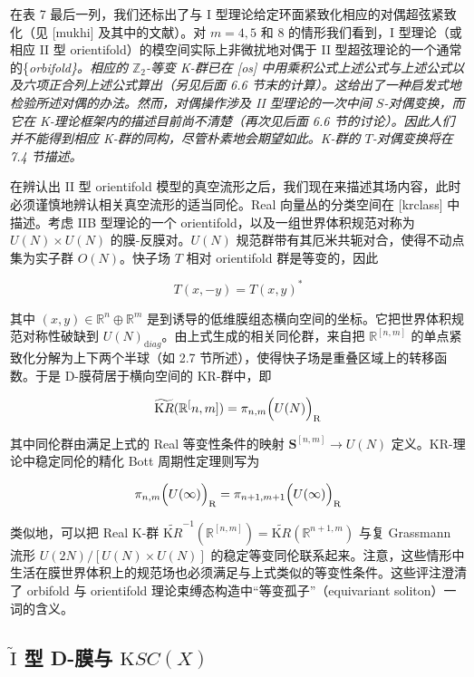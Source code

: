 \documentclass[11pt,a4paper]{ctexart}
\newcommand{\SrcRange}[2]{\marginpar{\raggedright\footnotesize 原文 p.#1}}
\begin{document}
在表 7 最后一列，我们还标出了与 I 型理论给定环面紧致化相应的对偶超弦紧致化（见 [mukhi] 及其中的文献）。对 \(m=4,5\) 和 8 的情形我们看到，I 型理论（或相应 II 型 orientifold）的模空间实际上非微扰地对偶于 II 型超弦理论的一个通常的\{\it orbifold\}。相应的 \({\mathbb{Z}}_2\)-等变 K-群已在 [os] 中用乘积公式上述公式与上述公式以及六项正合列上述公式算出（另见后面 6.6 节末的计算）。这给出了一种启发式地检验所述对偶的办法。然而，对偶操作涉及 II 型理论的一次中间 \(S\)-对偶变换，而它在 K-理论框架内的描述目前尚不清楚（再次见后面 6.6 节的讨论）。因此人们并不能得到相应 K-群的同构，尽管朴素地会期望如此。K-群的 \(T\)-对偶变换将在 7.4 节描述。

在辨认出 II 型 orientifold 模型的真空流形之后，我们现在来描述其场内容，此时必须谨慎地辨认相关真空流形的适当同伦。Real 向量丛的分类空间在 [krclass] 中描述。考虑 IIB 型理论的一个 orientifold，以及一组世界体积规范对称为 \(U(N)\times U(N)\) 的膜-反膜对。\(U(N)\) 规范群带有其厄米共轭对合，使得不动点集为实子群 \(O(N)\)。快子场 \(T\) 相对 orientifold 群是等变的，因此

\[T(x,-y)=T(x,y)^*\]

其中 \((x,y)\in{\mathbb{R}}^n\oplus{\mathbb{R}}^m\) 是到诱导的低维膜组态横向空间的坐标。它把世界体积规范对称性破缺到 \(U(N)_{\mathrm diag}\)。由上式生成的相关同伦群，来自把 \({\mathbb{R}}^[n,m]\) 的单点紧致化分解为上下两个半球（如 2.7 节所述），使得快子场是重叠区域上的转移函数。于是 D-膜荷居于横向空间的 KR-群中，即

\[\widetilde{{\mathrm KR}}({\mathbb{R}}^[n,m])=\pi_{n,m}\Bigl(U(N)\Bigr)_{\mathrm R}\]

其中同伦群由满足上式的 Real 等变性条件的映射 \({\mathbf S}^[n,m]\to U(N)\) 定义。KR-理论中稳定同伦的精化 Bott 周期性定理则写为

\[\pi_{n,m}\Bigl(U(\infty)\Bigr)_{\mathrm R}=
\pi_{n+1,m+1}\Bigl(U(\infty)\Bigr)_{\mathrm R}\]

类似地，可以把 Real K-群 \(\widetilde{{\mathrm KR}}^{-1}({\mathbb{R}}^[n,m])=\widetilde{{\mathrm KR}}({\mathbb{R}}^{n+1,m})\) 与复 Grassmann 流形 \(U(2N)/[U(N)\times U(N)]\) 的稳定等变同伦联系起来。注意，这些情形中生活在膜世界体积上的规范场也必须满足与上式类似的等变性条件。这些评注澄清了 orbifold 与 orientifold 理论束缚态构造中``等变孤子''（equivariant soliton）一词的含义。

\SrcRange{78}{78}
\subsection{\texorpdfstring{\(\widetilde{\mathrm I}\) 型 D-膜与 \({\mathrm KSC}(X)\)}{\textbackslash widetilde\{\textbackslash mathrm I\} 型 D-膜与 \{\textbackslash mathrm KSC\}(X)}}\label{widetildemathrm-i-ux578b-d-ux819cux4e0e-mathrm-kscx}
\end{document}
